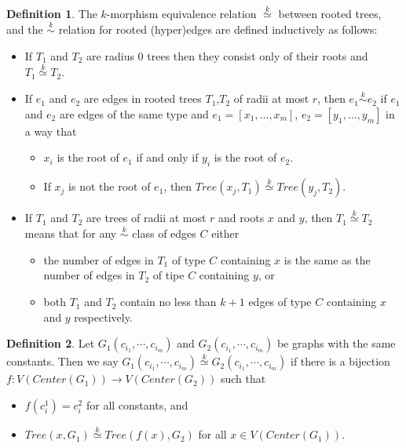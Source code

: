 \documentclass[11pt,notitlepage]{report}
\theoremstyle{definition}
\newtheorem{definition}{Definition}[chapter]
\theoremstyle{remark}
\newcommand{\clist}{c_{i_1}, \cdots, c_{i_m}}
\newcommand{\morph}[1]{\stackrel{#1}{\simeq}}
\begin{document}
\begin{definition} 
	The $k$-morphism equivalence relation $\morph{k}$ between rooted trees,
	and the $\stackrel{k}{\sim}$ relation for rooted (hyper)edges are defined inductively as follows:
	\begin{itemize}
		\item If $T_1$ and $T_2$ are radius $0$ trees then they consist only of
		their roots and $T_1\morph{k} T_2$. 
		\item 
		If $e_1$ and $e_2$ are edges in rooted trees $T_1$,$T_2$ of radii at most $r$,
		then $e_1\stackrel{k}{\sim} e_2$ if $e_1$ and $e_2$ are edges of the same 
		type and $e_1=[x_1,\dots, x_m]$, $e_2=[y_1,\dots,y_m]$ in a way that
		\begin{itemize}
			\item $x_i$ is the root of $e_1$ if and only if $y_i$ is the root of $e_2$.
			\item If $x_j$ is not the root of $e_1$, then
			$Tree(x_j, T_1)\morph{k} Tree(y_j, T_2)$.
		\end{itemize}
		\item If $T_1$ and $T_2$ are trees of radii at most $r$ and roots $x$ and $y$,
		then $T_1\morph{k} T_2$ means that for any $\stackrel{k}{\sim}$ class
		of edges $C$ either
		\begin{itemize}
			\item the number of edges in $T_1$ of type $C$ containing $x$ is the same
			as the number of edges in $T_2$ of tipe $C$ containing $y$, or
			\item both $T_1$ and $T_2$ contain no less than $k+1$ edges of type $C$
			containing $x$ and $y$ respectively. 
		\end{itemize}
		 
	\end{itemize}
	
\end{definition}

\begin{definition} 
	Let $G_1(\clist)$ and $G_2(\clist)$ be graphs with the same constants. Then
	we say $G_1(\clist)\morph{k}G_2(\clist)$ if there is a bijection 
	$f:V(Center(G_1))\rightarrow V(Center(G_2))$ such that
	\begin{itemize}
		\item $f(c^1_i)=c^2_i$ for all constants, and
		\item $Tree(x,G_1)\morph{k} Tree(f(x),G_2)$ for all $x\in V(Center(G_1))$.
	\end{itemize}
\end{definition}
\end{document}

